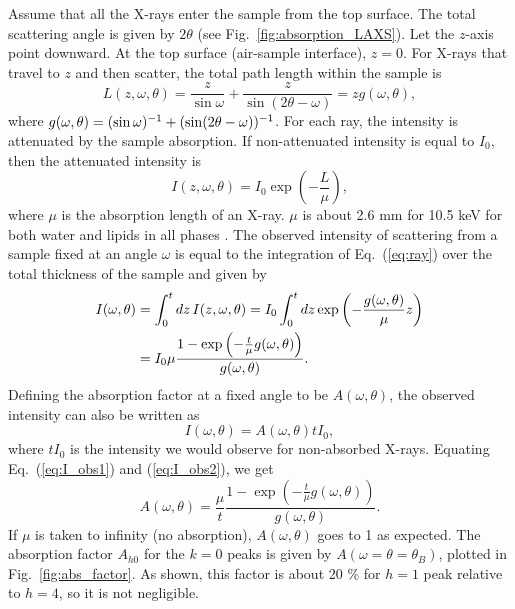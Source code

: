 Assume that all the X-rays enter the sample from the top surface. The total scattering
angle is given by $2\theta$ (see Fig.~\ref{fig:absorption_LAXS}).
Let the $z$-axis point downward. At the top surface
(air-sample interface), $z=0$. For X-rays that travel to $z$ and then scatter, the
total path length within the sample is 
\begin{equation}
  L(z,\omega,\theta) 
  = \frac{z}{\sin\omega}+\frac{z}{\sin(2\theta-\omega)} 
  = zg(\omega,\theta),
\end{equation}
where $g(\omega,\theta)=(\sin\omega)^{-1}+\mathopen{}\left( \sin\mathopen{}\left( 2\theta-\omega \right)\mathclose{} \right)\mathclose{}^{-1}$.
For each ray, the intensity is attenuated by the sample absorption. 
If non-attenuated 
intensity is equal to $I_0$, then the attenuated intensity is
\begin{equation}
  I(z,\omega,\theta) = I_0\exp\left(-\frac{L}{\mu}\right),
  \label{eq:ray}
\end{equation}
where $\mu$ is the absorption length of an X-ray. $\mu$ is about 2.6 mm for 10.5 keV
for both water and lipids in all phases \cite{ref:cxro}.
The observed intensity of scattering from a sample fixed at an angle $\omega$ 
is equal to the integration
of Eq.~(\ref{eq:ray}) over the total thickness of the sample and given by
\begin{align}
  I(\omega,\theta) 
    &= \int_0^t \mathop{dz} I(z,\omega,\theta)
     = I_0\int_0^t\mathop{dz} \exp\left(-\frac{g(\omega,\theta)}{\mu}z\right) \nonumber \\
    &= I_0\mu \frac{1-\exp\left(-\frac{t}{\mu}g(\omega,\theta)\right)}{g(\omega,\theta)}.
    \label{eq:I_obs1}
\end{align}
Defining the absorption factor at a fixed angle to be $A(\omega,\theta)$, 
the observed intensity can also be written as
\begin{equation}
  I(\omega,\theta)=A(\omega,\theta)tI_0,
  \label{eq:I_obs2}
\end{equation}
where $tI_0$ is the intensity we would observe for non-absorbed X-rays.
Equating Eq.~(\ref{eq:I_obs1}) and (\ref{eq:I_obs2}), we get
\begin{equation}
  A(\omega,\theta) = \frac{\mu}{t} 
                     \frac{1-\exp\left(-\frac{t}{\mu}g(\omega,\theta)\right)}{g(\omega,\theta)}.
  \label{eq:ang_abs_factor}
\end{equation}
If $\mu$ is taken to infinity (no absorption), $A(\omega,\theta)$ 
goes to 1 as expected.
The absorption factor $A_{h0}$ for the $k=0$ peaks is given by
$A(\omega=\theta=\theta_B)$, plotted in Fig.~\ref{fig:abs_factor}.
As shown, this factor is about 20 \% for $h=1$ peak relative to
$h=4$, so it is not negligible.

